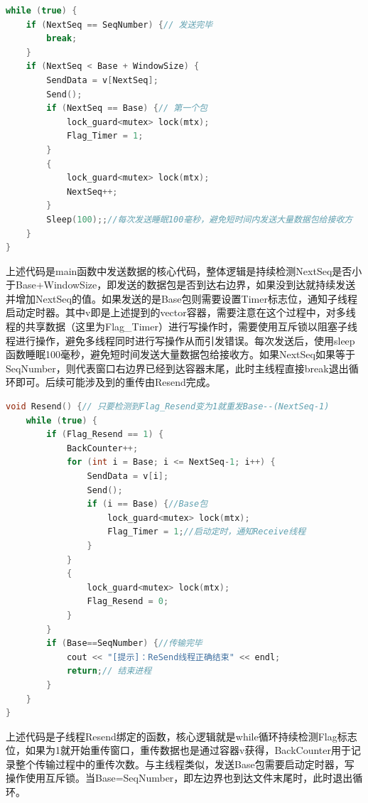 \documentclass[UTF8,a4paper,10pt]{ctexart}
\begin{document}
\begin{lstlisting}[frame=trbl,language={C++}]
while (true) {
    if (NextSeq == SeqNumber) {// 发送完毕
        break;
    }
    if (NextSeq < Base + WindowSize) {
        SendData = v[NextSeq];
        Send();
        if (NextSeq == Base) {// 第一个包
            lock_guard<mutex> lock(mtx);
            Flag_Timer = 1;
        }
        {
            lock_guard<mutex> lock(mtx);
            NextSeq++;
        }
        Sleep(100);;//每次发送睡眠100毫秒，避免短时间内发送大量数据包给接收方
    }
}
\end{lstlisting}\par
上述代码是main函数中发送数据的核心代码，整体逻辑是持续检测NextSeq是否小于Base+WindowSize，即发送的数据包是否到达右边界，如果没到达就持续发送并增加NextSeq的值。如果发送的是Base包则需要设置Timer标志位，通知子线程启动定时器。其中v即是上述提到的vector容器，需要注意在这个过程中，对多线程的共享数据（这里为Flag\_Timer）进行写操作时，需要使用互斥锁以阻塞子线程进行操作，避免多线程同时进行写操作从而引发错误。每次发送后，使用sleep函数睡眠100毫秒，避免短时间发送大量数据包给接收方。如果NextSeq如果等于SeqNumber，则代表窗口右边界已经到达容器末尾，此时主线程直接break退出循环即可。后续可能涉及到的重传由Resend完成。
\begin{lstlisting}[frame=trbl,language={C++}]
void Resend() {// 只要检测到Flag_Resend变为1就重发Base--(NextSeq-1)
    while (true) {
        if (Flag_Resend == 1) {
            BackCounter++;
            for (int i = Base; i <= NextSeq-1; i++) {
                SendData = v[i];
                Send();
                if (i == Base) {//Base包
                    lock_guard<mutex> lock(mtx);
                    Flag_Timer = 1;//启动定时，通知Receive线程
                }
            }
            {
                lock_guard<mutex> lock(mtx);
                Flag_Resend = 0;
            }
        }
        if (Base==SeqNumber) {//传输完毕
            cout << "[提示]：ReSend线程正确结束" << endl;
            return;// 结束进程
        }
    }
}
\end{lstlisting}\par
上述代码是子线程Resend绑定的函数，核心逻辑就是while循环持续检测Flag标志位，如果为1就开始重传窗口，重传数据也是通过容器v获得，BackCounter用于记录整个传输过程中的重传次数。与主线程类似，发送Base包需要启动定时器，写操作使用互斥锁。当Base=SeqNumber，即左边界也到达文件末尾时，此时退出循环。
\end{document}
